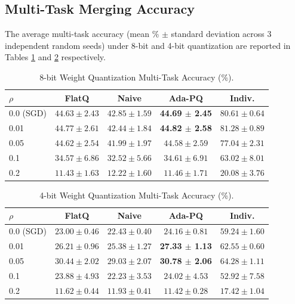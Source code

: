 \subsection{Multi-Task Merging Accuracy}

The average multi-task accuracy (mean \% $\pm$ standard deviation across 3 independent random seeds) under 8-bit and 4-bit quantization are reported in Tables \ref{tab:results_8bit} and \ref{tab:results_4bit} respectively.

\begin{table}[t]
\caption{8-bit Weight Quantization Multi-Task Accuracy (\%).}
\label{tab:results_8bit}
\vskip 0.15in
\centering
\begin{scriptsize}
\begin{sc}
\setlength{\tabcolsep}{1.5pt}
\begin{tabular}{lcccc}
\toprule
$\rho$ & FlatQ & Naive & Ada-PQ & Indiv. \\
\midrule
0.0 (SGD)   & $44.63 \pm 2.43$ & $42.85 \pm 1.59$ & \textbf{44.69 $\pm$ 2.45} & $80.61 \pm 0.64$ \\
0.01        & $44.77 \pm 2.61$ & $42.44 \pm 1.84$ & \textbf{44.82 $\pm$ 2.58} & $81.28 \pm 0.89$ \\
0.05        & \textbf{$44.62 \pm 2.54$} & $41.99 \pm 1.97$ & $44.58 \pm 2.59$ & $77.04 \pm 2.31$ \\
0.1         & $34.57 \pm 6.86$ & $32.52 \pm 5.66$ & $34.61 \pm 6.91$ & $63.02 \pm 8.01$ \\
0.2         & $11.43 \pm 1.63$ & $12.22 \pm 1.60$ & $11.46 \pm 1.71$ & $20.08 \pm 3.76$ \\
\bottomrule
\end{tabular}
\end{sc}
\end{scriptsize}
\vskip -0.1in
\end{table}

\begin{table}[t]
\caption{4-bit Weight Quantization Multi-Task Accuracy (\%).}
\label{tab:results_4bit}
\vskip 0.15in
\centering
\begin{scriptsize}
\begin{sc}
\setlength{\tabcolsep}{1.5pt}
\begin{tabular}{lcccc}
\toprule
$\rho$ & FlatQ & Naive & Ada-PQ & Indiv. \\
\midrule
0.0 (SGD)   & $23.00 \pm 0.46$ & $22.43 \pm 0.40$ & $24.16 \pm 0.81$ & $59.24 \pm 1.60$ \\
0.01        & $26.21 \pm 0.96$ & $25.38 \pm 1.27$ & \textbf{27.33 $\pm$ 1.13} & $62.55 \pm 0.60$ \\
0.05        & $30.44 \pm 2.02$ & $29.03 \pm 2.07$ & \textbf{30.78 $\pm$ 2.06} & $64.28 \pm 1.11$ \\
0.1         & $23.88 \pm 4.93$ & $22.23 \pm 3.53$ & $24.02 \pm 4.53$ & $52.92 \pm 7.58$ \\
0.2         & $11.62 \pm 0.44$ & $11.93 \pm 0.41$ & $11.42 \pm 0.28$ & $17.42 \pm 1.04$ \\
\bottomrule
\end{tabular}
\end{sc}
\end{scriptsize}
\vskip -0.1in
\end{table}

